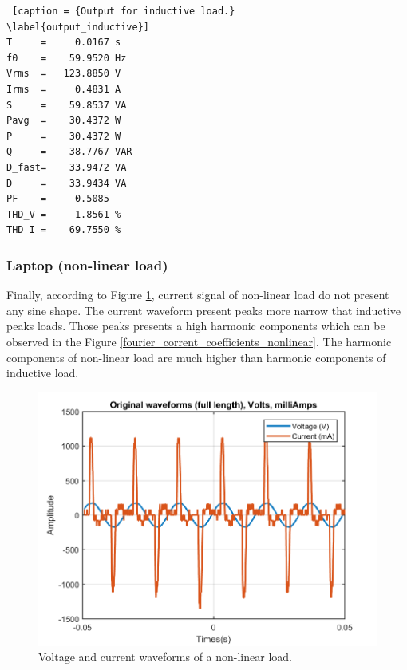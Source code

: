 \documentclass[journal]{IEEEtran}
\begin{document}
\begin{lstlisting} [caption = {Output for inductive load.}
\label{output_inductive}]
T     =     0.0167 s 
f0    =    59.9520 Hz 
Vrms  =   123.8850 V
Irms  =     0.4831 A
S     =    59.8537 VA
Pavg  =    30.4372 W 
P     =    30.4372 W 
Q     =    38.7767 VAR 
D_fast=    33.9472 VA 
D     =    33.9434 VA 
PF    =     0.5085 
THD_V =     1.8561 %
THD_I =    69.7550 %
\end{lstlisting}

\subsubsection{Laptop (non-linear load)} Finally, 
according to Figure \ref{original_no_lineal_load},  
current signal of non-linear load do not present any 
sine shape. The current waveform present peaks more 
narrow that inductive peaks loads. Those peaks 
presents a high harmonic components which can be observed 
in the Figure \ref{fourier_corrent_coefficients_nonlinear}. 
The harmonic components of non-linear load are much higher 
than harmonic components of inductive load. 

\begin{figure}[h]
\centering
\includegraphics[clip,width=\columnwidth]
{original_waveform_computer.png}
\caption{Voltage and current waveforms of a non-linear load.}
\label{original_no_lineal_load}
\end{figure}
\end{document}
